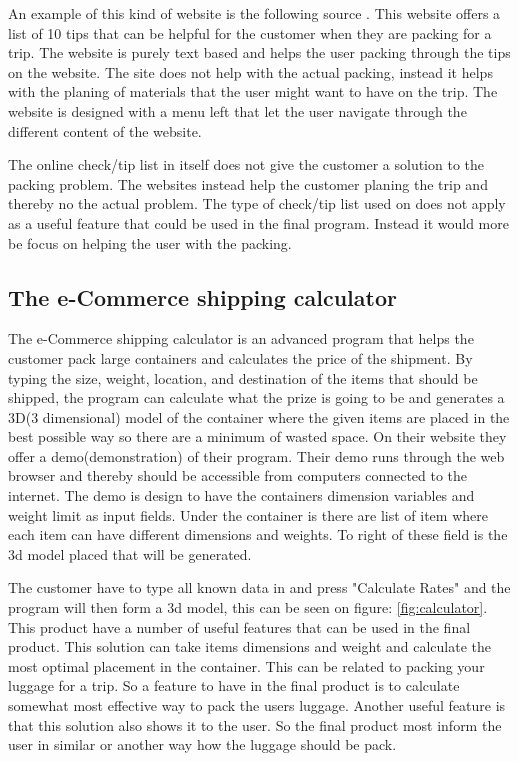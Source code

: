 An example of this kind of website is the following source \citep{onlinecheck}. This website offers a list of 10 tips that can be helpful for the customer when they are packing for a trip. The website is purely text based and helps the user packing through the tips on the website.
The site does not help with the actual packing, instead it helps with the planing of materials that the user might want to have on the trip.
The website is designed with a menu left that let the user navigate through the different content of the website.

The online check/tip list in itself does not give the customer a solution to the packing problem. The websites instead help the customer planing the trip and thereby no the actual problem. The type of check/tip list used on \citep{onlinecheck} does not apply as a useful feature that could be used in the final program. Instead it would more be focus on helping the user with the packing.

\subsection{The e-Commerce shipping calculator}

The e-Commerce shipping calculator is an advanced program that helps the customer pack large containers and calculates the price of the shipment.
By typing the size, weight, location, and destination of the items that should be shipped, the program can calculate what the prize is going to be and generates a 3D(3 dimensional) model of the container where the given items are placed in the best possible way so there are a minimum of wasted space. On their website \citep{solvingmaze} they offer a demo(demonstration) of their program. Their demo runs through the web browser and thereby should be accessible from computers connected to the internet.
The demo is design to have the containers dimension variables and weight limit as input fields. Under the container is there are list of item where each item can have different dimensions and weights. To right of these field is the 3d model placed that will be generated.


The customer have to type all known data in and press "Calculate Rates" and the program will then form a 3d model, this can be seen on figure: \ref{fig:calculator}.
This product have a number of useful features that can be used in the final product. This solution can take items dimensions and weight and calculate the most optimal placement in the container. This can be related to packing your luggage for a trip. So a feature to have in the final product is to  calculate somewhat most effective way to pack the users luggage. Another useful feature is that this solution also shows it to the user. So the final product most inform the user in similar or another way how the luggage should be pack.

